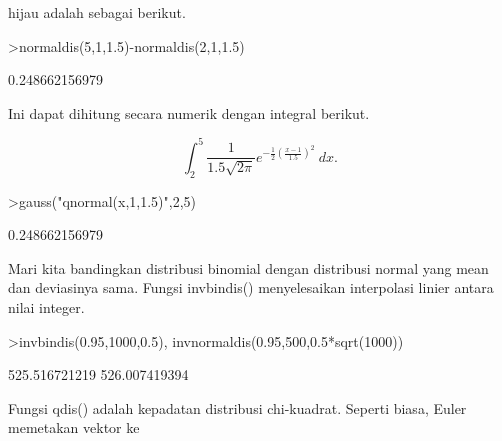 \documentclass[a4paper,10pt]{article}
\begin{document}
\begin{eulernotebook}
\begin{eulercomment}
\begin{eulercomment}
\begin{eulercomment}
\begin{eulercomment}
\begin{eulercomment}
\begin{eulercomment}
\begin{eulercomment}
\begin{eulercomment}
\begin{eulercomment}
\begin{eulercomment}
\begin{eulercomment}
\begin{eulercomment}
\begin{eulercomment}
\begin{eulercomment}
\begin{eulercomment}
\begin{eulercomment}
\begin{eulercomment}
\begin{eulercomment}
\begin{eulercomment}
\begin{eulercomment}
\begin{eulercomment}
\begin{eulercomment}
\begin{eulercomment}
\begin{eulercomment}
\begin{eulercomment}
\begin{eulercomment}
\begin{eulercomment}
\begin{eulercomment}
\begin{eulercomment}
\begin{eulercomment}
\begin{eulercomment}
\begin{eulercomment}
\begin{eulercomment}
\begin{eulercomment}
\begin{eulercomment}
\begin{eulercomment}
\begin{eulercomment}
\begin{eulercomment}
\begin{eulercomment}
\begin{eulercomment}
\begin{eulercomment}
\begin{eulercomment}
\begin{eulercomment}
\begin{eulercomment}
\begin{eulercomment}
\begin{eulercomment}
\begin{eulercomment}
\begin{eulercomment}
\begin{eulercomment}
\begin{eulercomment}
\begin{eulercomment}
\begin{eulercomment}
\begin{eulercomment}
\begin{eulercomment}
\begin{eulercomment}
\begin{eulercomment}
\begin{eulercomment}
\begin{eulercomment}
\begin{eulercomment}
\begin{eulercomment}
\begin{eulercomment}
\begin{eulercomment}
\begin{eulercomment}
\begin{eulercomment}
\begin{eulercomment}
\begin{eulercomment}
\begin{eulercomment}
hijau adalah sebagai berikut.
\end{eulercomment}
\begin{eulerprompt}
>normaldis(5,1,1.5)-normaldis(2,1,1.5)
\end{eulerprompt}
\begin{euleroutput}
  0.248662156979
\end{euleroutput}
\begin{eulercomment}
Ini dapat dihitung secara numerik dengan integral berikut.\\
\end{eulercomment}
\begin{eulerformula}
\[
\int_2^5 \frac{1}{1.5\sqrt{2\pi}}e^{-\frac{1}{2}(\frac{x-1}{1.5})^2}\ dx .
\]
\end{eulerformula}
\begin{eulerprompt}
>gauss("qnormal(x,1,1.5)",2,5)
\end{eulerprompt}
\begin{euleroutput}
  0.248662156979
\end{euleroutput}
\begin{eulercomment}
Mari kita bandingkan distribusi binomial dengan distribusi normal yang
mean dan deviasinya sama. Fungsi invbindis() menyelesaikan interpolasi
linier antara nilai integer.
\end{eulercomment}
\begin{eulerprompt}
>invbindis(0.95,1000,0.5), invnormaldis(0.95,500,0.5*sqrt(1000))
\end{eulerprompt}
\begin{euleroutput}
  525.516721219
  526.007419394
\end{euleroutput}
\begin{eulercomment}
Fungsi qdis() adalah kepadatan distribusi chi-kuadrat. Seperti biasa,
Euler memetakan vektor ke 
\end{eulercomment}
\end{eulercomment}
\end{eulercomment}
\end{eulercomment}
\end{eulercomment}
\end{eulercomment}
\end{eulercomment}
\end{eulercomment}
\end{eulercomment}
\end{eulercomment}
\end{eulercomment}
\end{eulercomment}
\end{eulercomment}
\end{eulercomment}
\end{eulercomment}
\end{eulercomment}
\end{eulercomment}
\end{eulercomment}
\end{eulercomment}
\end{eulercomment}
\end{eulercomment}
\end{eulercomment}
\end{eulercomment}
\end{eulercomment}
\end{eulercomment}
\end{eulercomment}
\end{eulercomment}
\end{eulercomment}
\end{eulercomment}
\end{eulercomment}
\end{eulercomment}
\end{eulercomment}
\end{eulercomment}
\end{eulercomment}
\end{eulercomment}
\end{eulercomment}
\end{eulercomment}
\end{eulercomment}
\end{eulercomment}
\end{eulercomment}
\end{eulercomment}
\end{eulercomment}
\end{eulercomment}
\end{eulercomment}
\end{eulercomment}
\end{eulercomment}
\end{eulercomment}
\end{eulercomment}
\end{eulercomment}
\end{eulercomment}
\end{eulercomment}
\end{eulercomment}
\end{eulercomment}
\end{eulercomment}
\end{eulercomment}
\end{eulercomment}
\end{eulercomment}
\end{eulercomment}
\end{eulercomment}
\end{eulercomment}
\end{eulercomment}
\end{eulercomment}
\end{eulercomment}
\end{eulercomment}
\end{eulercomment}
\end{eulercomment}
\end{eulercomment}
\end{eulernotebook}
\end{document}
